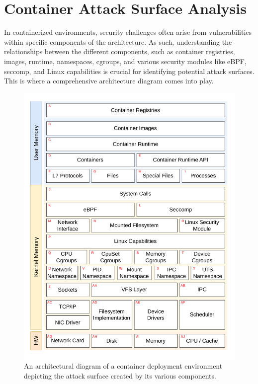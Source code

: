 \section{Container Attack Surface Analysis}
\label{sec:container-attack-surface-analysis}

In containerized environments, security challenges often arise from vulnerabilities within specific components of the architecture. As such, understanding the relationships between the different components, such as container registries, images, runtime, namespaces, cgroups, and various security modules like eBPF, seccomp, and Linux capabilities is crucial for identifying potential attack surfaces. This is where a comprehensive architecture diagram comes into play.

\begin{figure}[t]
  \label{fig:architecture}
  \includegraphics[width=1\linewidth]{figs/exploit-coverage.pdf}
  \caption{An architectural diagram of a container deployment environment depicting the attack surface created by its various components.}
\end{figure}


